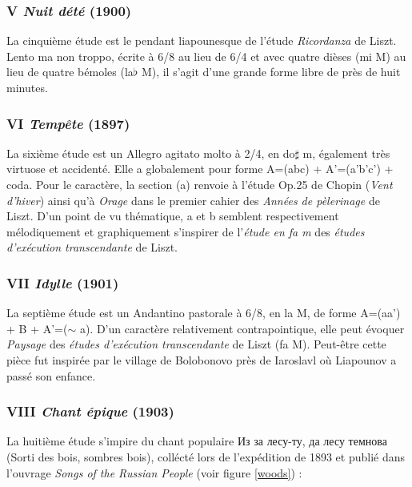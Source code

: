 \subsubsection{V \emph{Nuit dété} (1900)}

La cinquième étude est le pendant liapounesque de l'étude \emph{Ricordanza} de Liszt. Lento ma non troppo, écrite à 6/8 au lieu de 6/4 et avec quatre dièses (mi M) au lieu de quatre bémoles (la$\flat$ M), il s'agit d'une grande forme libre de près de huit minutes.

\subsubsection{VI \emph{Tempête} (1897)}

La sixième étude est un Allegro agitato molto à 2/4, en do$\sharp$ m, également très virtuose et accidenté. Elle a globalement pour forme A=(abc) + A'=(a'b'c') + coda. Pour le caractère, la section (a) renvoie à l'étude  Op.25 de Chopin (\emph{Vent d'hiver}) ainsi qu'à \emph{Orage} dans le premier cahier des \emph{Années de pèlerinage} de Liszt. D'un point de vu thématique, a et b semblent respectivement mélodiquement et graphiquement s'inspirer de l'\emph{étude en fa m} des \emph{études d'exécution transcendante} de Liszt.

\subsubsection{VII \emph{Idylle} (1901)}

La septième étude est un Andantino pastorale à 6/8, en la M, de forme A=(aa') + B + A'=($\sim$ a). D'un caractère relativement contrapointique, elle peut évoquer \emph{Paysage} des \emph{études d'exécution transcendante} de Liszt (fa M). Peut-être cette pièce fut inspirée par le village de Bolobonovo près de Iaroslavl où Liapounov a passé son enfance.

\subsubsection{VIII \emph{Chant épique} (1903)}

La huitième étude s'impire du chant populaire \foreignlanguage{russian}{Из за лесу-ту, да лесу темнова} (Sorti des bois, sombres bois), collécté lors de l'expédition de 1893 et publié dans l'ouvrage \emph{Songs of the Russian People} (voir figure \ref{woods}) :\\

